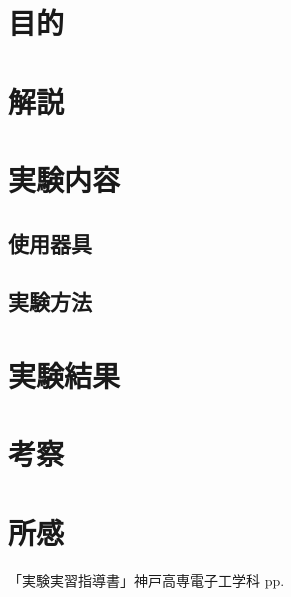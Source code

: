 \documentclass[11pt]{ltjsarticle}
\title{}
\begin{document}
\maketitle

\section{目的}
	
\section{解説}
	\subsection{}
\section{実験内容}
	\subsection{使用器具}
	\subsection{実験方法}
\section{実験結果}
\section{考察}
\section{所感}
\begin{thebibliography}{99}
「実験実習指導書」神戸高専電子工学科 pp.
\end{thebibliography}
\end{document}
